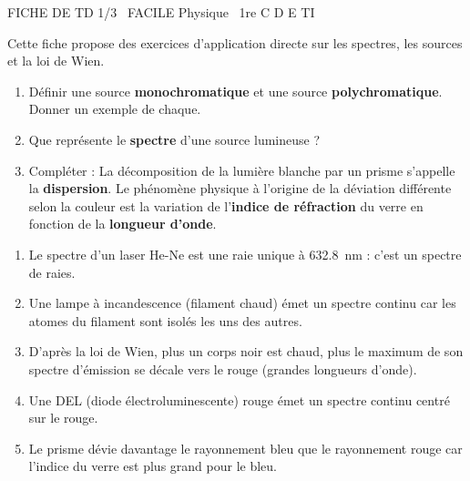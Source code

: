 \documentclass[11pt]{article}
\begin{document}
\begin{tcolorbox}[enhanced,colback=popink,colframe=popink,arc=10pt,boxrule=0pt,left=12pt,right=12pt,top=9pt,bottom=9pt]
{\color{white}\popxbold\small FICHE DE TD 1/3 \textbullet\ FACILE \hfill Physique \textbullet\ 1re C D E TI\par}
\end{tcolorbox}
\vspace{4pt}
Cette fiche propose des exercices d'application directe sur les spectres, les sources et la loi de Wien.

\begin{exercice}
\begin{enumerate}
    \item Définir une source \textbf{monochromatique} et une source \textbf{polychromatique}. Donner un exemple de chaque.
    \item Que représente le \textbf{spectre} d'une source lumineuse ?
    \item Compléter : La décomposition de la lumière blanche par un prisme s'appelle la \textbf{dispersion}. Le phénomène physique à l'origine de la déviation différente selon la couleur est la variation de l'\textbf{indice de réfraction} du verre en fonction de la \textbf{longueur d'onde}.
\end{enumerate}
\end{exercice}

\begin{exercice}
\begin{enumerate}
    \item Le spectre d'un laser He-Ne est une raie unique à \SI{632,8}{\nano\meter} : c'est un spectre de raies.
    \item Une lampe à incandescence (filament chaud) émet un spectre continu car les atomes du filament sont isolés les uns des autres.
    \item D'après la loi de Wien, plus un corps noir est chaud, plus le maximum de son spectre d'émission se décale vers le rouge (grandes longueurs d'onde).
    \item Une DEL (diode électroluminescente) rouge émet un spectre continu centré sur le rouge.
    \item Le prisme dévie davantage le rayonnement bleu que le rayonnement rouge car l'indice du verre est plus grand pour le bleu.
\end{enumerate}
\end{exercice}
\end{document}
